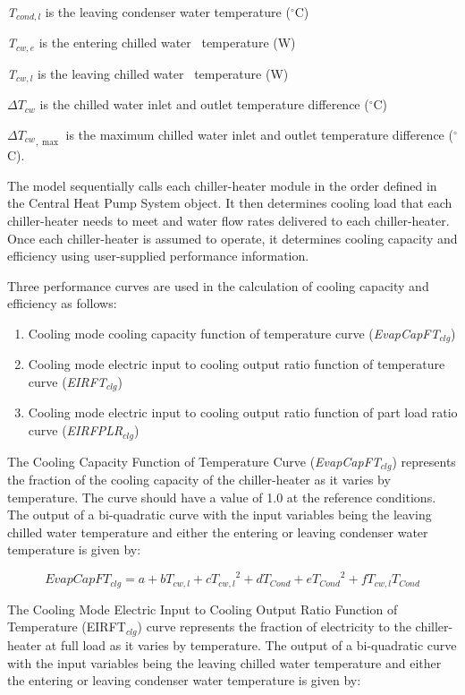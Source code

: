 \emph{T\(_{cond,l}\)} is the leaving condenser water temperature (\(^{\circ}\)C)

\emph{T\(_{cw,e}\)} is the entering chilled water~ temperature (W)

\emph{T\(_{cw,l}\)} is the leaving chilled water~ temperature (W)

\(\Delta {T_{cw}}\) is the chilled water inlet and outlet temperature difference (\(^{\circ}\)C)

\(\Delta {T_{cw}}_{,\max }\) is the maximum chilled water inlet and outlet temperature difference (\(^{\circ}\)C).

The model sequentially calls each chiller-heater module in the order defined in the Central Heat Pump System object. It then determines cooling load that each chiller-heater needs to meet and water flow rates delivered to each chiller-heater. Once each chiller-heater is assumed to operate, it determines cooling capacity and efficiency using user-supplied performance information.

Three performance curves are used in the calculation of cooling capacity and efficiency as follows:

\begin{enumerate}
\item Cooling mode cooling capacity function of temperature curve (\emph{EvapCapFT\(_{clg}\)})
\item Cooling mode electric input to cooling output ratio function of temperature curve (\emph{EIRFT\(_{clg}\)})
\item Cooling mode electric input to cooling output ratio function of part load ratio curve (\emph{EIRFPLR\(_{clg}\)})
\end{enumerate}

The Cooling Capacity Function of Temperature Curve (\emph{EvapCapFT\(_{clg}\)}) represents the fraction of the cooling capacity of the chiller-heater as it varies by temperature. The curve should have a value of 1.0 at the reference conditions. The output of a bi-quadratic curve with the input variables being the leaving chilled water temperature and either the entering or leaving condenser water temperature is given by:

\begin{equation}
EvapCapF{T_{clg}} = a + b{T_{cw,l}} + c{T_{cw,l}}^2 + d{T_{Cond}} + e{T_{Cond}}^2 + f{T_{cw,l}}{T_{Cond}}
\end{equation}

The Cooling Mode Electric Input to Cooling Output Ratio Function of Temperature (EIRFT\(_{clg}\)) curve represents the fraction of electricity to the chiller-heater at full load as it varies by temperature. The output of a bi-quadratic curve with the input variables being the leaving chilled water temperature and either the entering or leaving condenser water temperature is given by:

